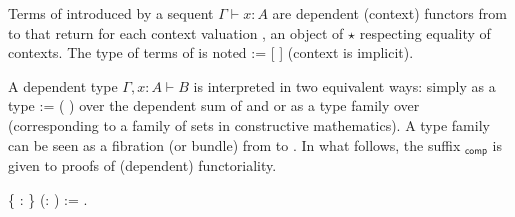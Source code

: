 \begin{coqdoccode}
\end{coqdoccode}
Terms of  introduced by a sequent $\Gamma \vdash x:A$ are
  dependent (context) functors from  to  that return for each
  context valuation \coqdocvariable{$\gamma$}, an object of  $\star$ \coqdocvariable{$\gamma$} respecting equality of
  contexts.  The type of terms of  is noted   := [\coqdocdefinition{$\Pi$} ]
  (context is implicit).  

  A dependent type $\Gamma, x:A \vdash B$ is interpreted in two
  equivalent ways: simply as a type   :=  (\coqdocvar{$\Sigma$} ) over the
  dependent sum of  and  or as a type family   over 
  (corresponding to a family of sets in constructive mathematics). A
  type family can be seen as a fibration (or bundle) from  to .
  In what follows, the suffix $\mathsf{_{comp}}$ is given to proofs of 
  (dependent) functoriality.
\begin{coqdoccode}
\coqdocemptyline
\coqdocnoindent
{}  \{ : \} (:  ) := \coqdoceol
\coqdocindent{1.00em}
\coqdocnotation{[}\coqdocdefinition{$\Pi$} \coqdocnotation{(} \coqdocvar{$\gamma$} \coqdocnotation{ } \coqdocnotation{(} \coqdocnotation{$\star$} \coqdocvariable{$\gamma$}\coqdocnotation{)}  \coqdocnotation{$\longrightarrow$} \coqdocnotation{;}  \coqdocvar{\_}\coqdocnotation{)}\coqdocnotation{]}.\coqdoceol
\coqdocemptyline
\end{coqdoccode}


